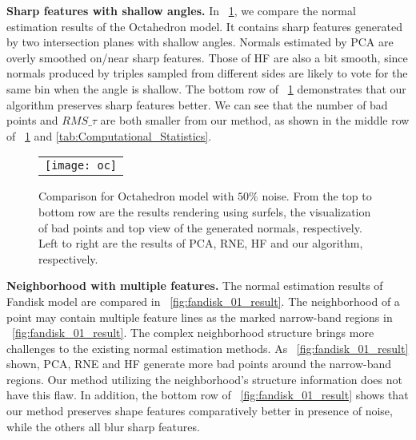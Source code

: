 \textbf{Sharp features with shallow angles.} In \fig~\ref{fig:octahedron_03_result}, we compare the normal estimation results of the Octahedron model. It contains sharp features generated by two intersection planes with shallow angles. Normals estimated by PCA are overly smoothed on/near sharp features. Those of HF are also a bit smooth, since normals produced by triples sampled from different sides are likely to vote for the same bin when the angle is shallow.
%
The bottom row of \fig~\ref{fig:octahedron_03_result} demonstrates that our algorithm  preserves sharp features better. We can see that the number of bad points and $RMS\_\tau$ are both smaller from our method, as shown in the middle row of \fig~\ref{fig:octahedron_03_result} and \tab \ref{tab:Computational_Statistics}.

\begin{figure}
\begin{center}
    \begin{tabular}{c}
        \texttt{[image: oc]}
    \end{tabular}
    \caption{Comparison for Octahedron model with $50\%$ noise.  From the top to bottom row are the results rendering using surfels, the visualization of bad points and top view of the generated normals, respectively. Left to right are the results of PCA, RNE, HF and our algorithm, respectively.\label{fig:octahedron_03_result}}
\end{center}
\end{figure}

\textbf{Neighborhood with multiple features.} The normal estimation results of Fandisk model are compared in \fig~\ref{fig:fandisk_01_result}.
%
The neighborhood of a point may contain multiple feature lines as the marked narrow-band regions in \fig~\ref{fig:fandisk_01_result}.
The complex neighborhood structure brings more challenges to the existing normal estimation methods.
%
As \fig~\ref{fig:fandisk_01_result} shown, PCA, RNE and HF generate more bad points around the narrow-band regions.
%
Our method utilizing the neighborhood's structure information does not have this flaw.
%
In addition, the bottom row of \fig~\ref{fig:fandisk_01_result} shows that our method preserves shape features comparatively better in presence of noise, while the others all blur sharp features.
%



